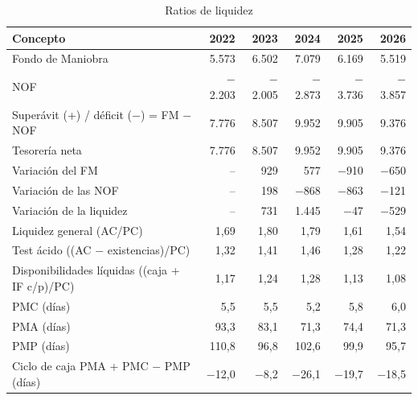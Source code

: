 \documentclass[11pt,a4paper]{article}
\newcommand{\mn}{\ensuremath{-}}                 %
\begin{document}
\begin{table}[H]
\centering
\caption{Ratios de liquidez}
\label{tab:liq}
\small
\begin{tabularx}{\textwidth}{@{}>{\raggedright\arraybackslash}p{6.3cm}RRRRR@{}}
\toprule
\color{navy}\textbf{Concepto} & \color{navy}\textbf{2022} & \color{navy}\textbf{2023} & \color{navy}\textbf{2024} & \color{navy}\textbf{2025} & \color{navy}\textbf{2026} \\
\midrule
Fondo de Maniobra & 5.573 & 6.502 & 7.079 & 6.169 & 5.519 \\
NOF & \mn2.203 & \mn2.005 & \mn2.873 & \mn3.736 & \mn3.857 \\
Superávit (+) / déficit (\mn) = FM \mn{} NOF & 7.776 & 8.507 & 9.952 & 9.905 & 9.376 \\
Tesorería neta & 7.776 & 8.507 & 9.952 & 9.905 & 9.376 \\
Variación del FM & -- & 929 & 577 & \mn910 & \mn650 \\
Variación de las NOF & -- & 198 & \mn868 & \mn863 & \mn121 \\
Variación de la liquidez & -- & 731 & 1.445 & \mn47 & \mn529 \\
\midrule
Liquidez general (AC/PC) & 1,69 & 1,80 & 1,79 & 1,61 & 1,54 \\
Test ácido ((AC \mn{} existencias)/PC) & 1,32 & 1,41 & 1,46 & 1,28 & 1,22 \\
Disponibilidades líquidas ((caja + IF c/p)/PC) & 1,17 & 1,24 & 1,28 & 1,13 & 1,08 \\
\midrule
PMC (días) & 5,5 & 5,5 & 5,2 & 5,8 & 6,0 \\
PMA (días) & 93,3 & 83,1 & 71,3 & 74,4 & 71,3 \\
PMP (días) & 110,8 & 96,8 & 102,6 & 99,9 & 95,7 \\
Ciclo de caja PMA + PMC \mn{} PMP (días) & \mn12,0 & \mn8,2 & \mn26,1 & \mn19,7 & \mn18,5 \\
\bottomrule
\end{tabularx}
\end{table}
\end{document}
